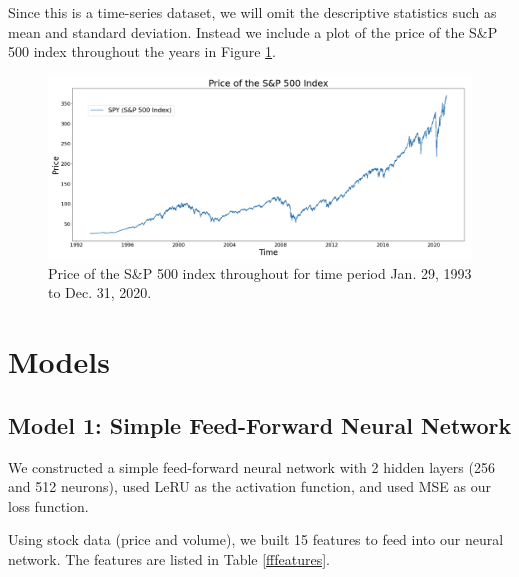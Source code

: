 \documentclass[10pt]{article}
\begin{document}
Since this is a time-series dataset, we will omit the descriptive statistics such as mean and standard deviation. Instead we include a plot of the price of the S\&P 500 index throughout the years in Figure \ref{sp500price}.

\begin{figure}[H]
\centering
\includegraphics[width=\textwidth]{sp500price}
\caption{Price of the S\&P 500 index throughout for time period Jan. 29, 1993 to Dec. 31, 2020.}
\label{sp500price}
\end{figure}



\section{Models}

\subsection{Model 1: Simple Feed-Forward Neural Network}

We constructed a simple feed-forward neural network with 2 hidden layers (256 and 512 neurons), used LeRU as the activation function, and used MSE as our loss function.

Using stock data (price and volume), we built 15 features to feed into our neural network. The features are listed in Table \ref{fffeatures}.
\end{document}
